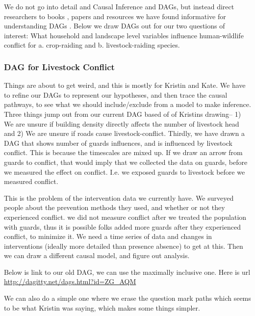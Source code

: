 \documentclass[12pt,]{article}
\begin{document}
We do not go into detail and Causal Inference and DAGs, but instead direct researchers to  books \citep{pearl2009causality,McElreath2020}, papers \citep{cinelli2020crash,Laubach_etal_CI_2021} and resources \citep{textor2016robust} we have found informative for understanding DAGs . Below we draw DAGs out for our two questions of interest: What household and landscape level variables influence human-wildlife conflict for a. crop-raiding and b. livestock-raiding species.

\subsubsection{DAG for Livestock Conflict}

Things are about to get weird, and this is mostly for Kristin and Kate. We have to refine our DAGs to represent our hypotheses, and then trace the causal pathways, to see what we should include/exclude from a model to make inference. Three things jump out from our current DAG based of of Kristins drawing-- 1) We are unsure if building density directly affects the number of livestock head and 2) We are unsure if roads cause livestock-conflict. Thirdly, we have drawn a DAG that shows number of guards influences, and is influenced by livestock conflict. 
This is because the timescales are mixed up. If we draw an arrow from guards to conflict, that would imply that we collected the data on guards, before we measured the effect on conflict. I.e. we exposed guards to livestock before we measured conflict. 

This is the problem of the intervention data we currently have. We surveyed people about the prevention methods they used, and whether or not they experienced conflict. we did not measure conflict after we treated the population with guards, thus it is possible folks added more guards after they experienced conflict, to minimize it. We need a time series of data and changes in interventions (ideally more detailed than presence absence)  to get at this. Then we can draw a different causal model, and figure out analysis.

Below is link to our old DAG, we can use the maximally inclusive one. Here is url \url{http://dagitty.net/dags.html?id=ZG_AQM}


We can also do a simple one where we erase the question mark paths which seems to be what Kristin was saying, which makes some things simpler. 
\end{document}
